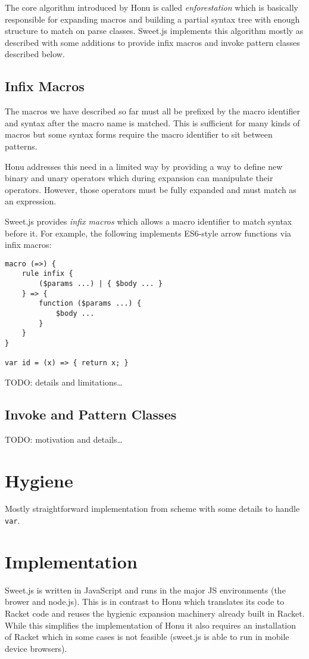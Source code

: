 \documentclass[preprint,10pt]{sigplanconf}
\begin{document}
The core algorithm introduced by Honu is called \emph{enforestation} which
is basically responsible for expanding macros and building a partial
syntax tree with enough structure to match on parse classes. Sweet.js
implements this algorithm mostly as described with some additions to
provide infix macros and invoke pattern classes described below.

\subsection{Infix Macros}
\label{sec-4-1}
The macros we have described so far must all be prefixed by the macro
identifier and syntax after the macro name is matched. This is
sufficient for many kinds of macros but some syntax forms require the
macro identifier to sit between patterns.

Honu addresses this need in a limited way by providing a way to define
new binary and unary operators which during expansion can manipulate
their operators. However, those operators must be fully expanded and
must match as an expression.

Sweet.js provides \emph{infix macros} which allows a macro identifier to
match syntax before it. For example, the following implements
ES6-style arrow functions via infix macros:

\begin{verbatim}
macro (=>) {
    rule infix {
        ($params ...) | { $body ... }
    } => {
        function ($params ...) {
            $body ...
        }
    }
}

var id = (x) => { return x; }
\end{verbatim}

TODO: details and limitations\ldots{}
\subsection{Invoke and Pattern Classes}
\label{sec-4-2}

TODO: motivation and details\ldots{}

\section{Hygiene}
\label{sec-5}

Mostly straightforward implementation from scheme with some details to
handle \texttt{var}.
\section{Implementation}
\label{sec-6}
Sweet.js is written in JavaScript and runs in the major JS
environments (\ie the brower and node.js). This is in contrast to Honu
which translates its code to Racket code and reuses the hygienic
expansion machinery already built in Racket. While this simplifies
the implementation of Honu it also requires an installation of Racket
which in some cases is not feasible (\eg sweet.js is able to run in
mobile device browsers).
\end{document}

